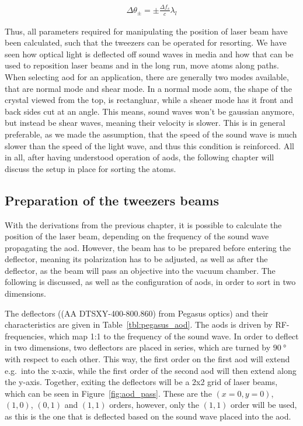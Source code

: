 \begin{align}
	\Delta\theta_\pm = \pm \frac {\Delta f_s}{c} \lambda_l
\end{align}

Thus, all parameters required for manipulating the position of laser beam have been calculated, such that the tweezers can be operated for resorting. We have seen how optical light is deflected off sound waves in media and how that can be used to reposition laser beams and in the long run, move atoms along paths. When selecting \ac{aod} for an application, there are generally two modes available, that are normal mode and shear mode. In a normal mode \ac{aom}, the shape of the crystal viewed from the top, is rectangluar, while a sheaer mode has it front and back sides cut at an angle. This means, sound waves won't be gaussian anymore, but instead be shear waves, meaning their velocity is slower. This is in general preferable, as we made the assumption, that the speed of the sound wave is much slower than the speed of the light wave, and thus this condition is reinforced. All in all, after having understood operation of \acp{aod}, the following chapter will discuss the setup in place for sorting the atoms.

\subsection{Preparation of the tweezers beams}

With the derivations from the previous chapter, it is possible to calculate the position of the laser beam, depending on the frequency of the sound wave propagating the \ac{aod}. However, the beam has to be prepared before entering the deflector, meaning its polarization has to be adjusted, as well as after the deflector, as the beam will pass an objective into the vacuum chamber. The following is discussed, as well as the configuration of \acp{aod}, in order to sort in two dimensions.

The deflectors ((AA DTSXY-400-800.860) from Pegasus optics) and their characteristics are given in Table~\ref{tbl:pegasus_aod}. The \acp{aod} is driven by RF-frequencies, which map 1:1 to the frequency of the sound wave.  In order to deflect in two dimensions, two deflectors are placed in series, which are turned by $\SI{90}{\degree}$ with respect to each other. This way, the first order on the first \ac{aod} will extend e.g.\ into the x-axis, while the first order of the second \ac{aod} will then extend along the y-axis. Together, exiting the deflectors will be a 2x2 grid of laser beams, which can be seen in Figure~\ref{fig:aod_pass}. These are the $(x=0, y=0)$, $(1, 0)$, $(0, 1)$ and $(1, 1)$ orders, however, only the $(1,1)$ order will be used, as this is the one that is deflected based on the sound wave placed into the \ac{aod}.

